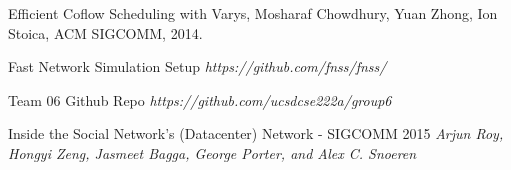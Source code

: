 \documentclass{article}
\begin{document}

\begin{thebibliography}{10}
Efficient Coflow Scheduling with Varys, Mosharaf Chowdhury, Yuan Zhong, Ion Stoica, ACM SIGCOMM, 2014.

Fast Network Simulation Setup \textit{https://github.com/fnss/fnss/}

Team 06 Github Repo \textit{https://github.com/ucsdcse222a/group6}

Inside the Social Network’s (Datacenter) Network - SIGCOMM 2015
\textit{Arjun Roy, Hongyi Zeng, Jasmeet Bagga, George Porter, and Alex C. Snoeren}

\end{thebibliography}
\end{document}
